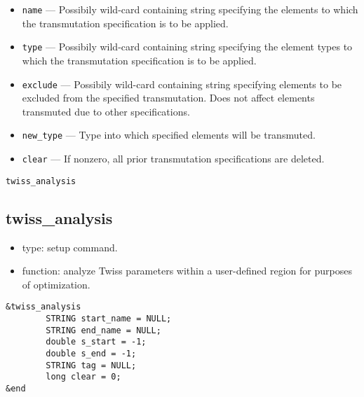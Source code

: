 \documentclass[11pt]{article}
\begin{document}
\begin{itemize}
\item \verb|name| --- Possibily wild-card containing string specifying the
	elements to which the transmutation specification is to be applied.
\item \verb|type| --- Possibily wild-card containing string specifying the
	element types to which the transmutation specification is to be applied.
\item \verb|exclude| --- Possibily wild-card containing string specifying 
	elements to be excluded from the specified transmutation.  Does not
	affect elements transmuted due to other specifications.
\item \verb|new_type| --- Type into which specified elements will be transmuted.
\item \verb|clear| --- If nonzero, all prior transmutation specifications are deleted.
\end{itemize}

\begin{latexonly}
\newpage
\begin{center}{\Large\verb|twiss_analysis|}\end{center}
\end{latexonly}
\subsection{twiss\_analysis}

\begin{itemize}
\item type: setup command.
\item function: analyze Twiss parameters within a user-defined region for purposes of
        optimization.
\end{itemize}

\begin{verbatim}
&twiss_analysis
        STRING start_name = NULL;
        STRING end_name = NULL;
        double s_start = -1;
        double s_end = -1;
        STRING tag = NULL;
        long clear = 0;
&end
\end{verbatim}
\end{document}
